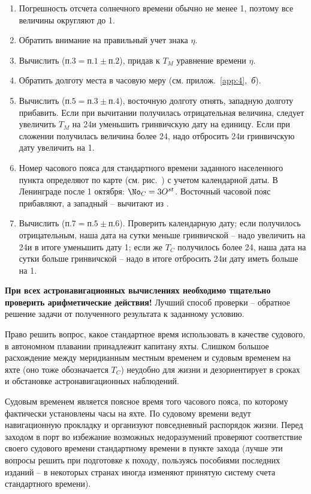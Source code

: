 \begin{small}
  \begin{enumerate} 
  \item Погрешность отсчета солнечного времени обычно не менее 1\tmin,
    поэтому все величины округляют до 1\tmin.
  \item Обратить внимание на правильный учет знака $\eta$.
  \item Вычислить ($\text{п.}3 = \text{п.}1 \pm \text{п.}2$), придав к
    $T_M$ уравнение времени $\eta$.
  \item Обратить долготу места в часовую меру
    (см. прилож.~\ref{app:4},~\textit{б}).
  \item Вычислить ($\text{п.}5 = \text{п.}3 \pm \text{п.}4$),
    восточную долготу отнять, западную долготу прибавить. Если при
    вычитании получилась отрицательная величина, следует увеличить
    $T_M$ на 24\thr и уменьшить гринвичскую дату на единицу. Если при
    сложении получилась величина более 24\thr, надо отбросить 24\thr и
    гринвичскую дату увеличить на 1\tday.
  \item Номер часового пояса для стандартного времени заданного
    населенного пункта определяют по карте (см. рис.~) с
    учетом календарной даты. В Ленинграде после 1 октября:
    $\mathNo_C = 3 \Ost$. Восточный часовой пояс прибавляют, а
    западный \--- вычитают из \Tgr.
  \item Вычислить ($\text{п.}7 = \text{п.}5 \pm
    \text{п.}6$). Проверить календарную дату; если 
    получилось отрицательным, наша дата на сутки меньше гринвичской
    \--- надо увеличить \Tgr на 24\thr и в итоге уменьшить дату
    1\tday; если же $T_C$ получилось более 24\thr, наша дата на сутки
    больше гринвичской \--- надо в итоге отбросить 24\thr и дату иметь
    больше на 1\tday.
  \end{enumerate}
\end{small}
  
\textbf{При всех астронавигационных вычислениях необходимо тщательно
  проверить арифметические действия!}  Лучший способ проверки \---
обратное решение задачи от полученного результата к заданному условию.

Право решить вопрос, какое стандартное время использовать в качестве судового, в автономном плавании принадлежит капитану яхты. Слишком большое расхождение между меридианным местным временем и судовым временем на яхте (оно тоже обозначается $T_C$) неудобно для жизни и дезориентирует в сроках и обстановке астронавигационных наблюдений.

Судовым временем является поясное время того часового пояса, по которому фактически установлены часы на яхте. По судовому времени ведут навигационную прокладку и организуют повседневный распорядок жизни. Перед заходом в порт во избежание возможных недоразумений проверяют соответствие своего судового времени стандартному времени в пункте захода (лучше эти вопросы решить при подготовке к походу, пользуясь пособиями последних изданий \--- в некоторых странах иногда изменяют принятую систему счета стандартного времени).

